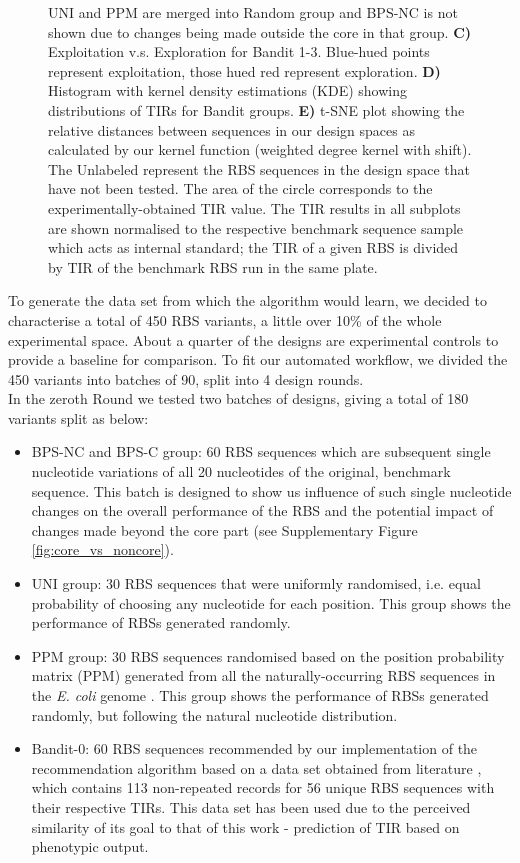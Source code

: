 \documentclass{scrartcl}[2013/05/29]%
\newcommand{\mengyan}[1]{\textcolor{magenta}{#1}}
\begin{document}
\begin{figure}[!ht]
{    UNI and PPM are merged into Random group and BPS-NC is not shown due to changes being made outside the core in that group.
    \textbf{C)} Exploitation v.s. Exploration for Bandit 1-3. Blue-hued points represent exploitation, those hued red represent exploration.
    \textbf{D)} Histogram with kernel density estimations (KDE) showing distributions of TIRs for Bandit groups.
    \textbf{E)} t-SNE plot showing the relative distances between sequences in our design spaces as calculated by our kernel function (weighted degree kernel with shift).
    The Unlabeled represent the RBS sequences in the design space that have not been tested.
    The area of the circle corresponds to the experimentally-obtained TIR value.
    The TIR results in all subplots are shown normalised to the respective benchmark sequence sample which acts as internal standard; the TIR of a given RBS is divided by TIR of the benchmark RBS run in the same plate. }
    \label{fig: Swarmplot and Quantplot}
\end{figure}

To generate the data set from which the algorithm would learn, we decided to characterise a total of 450 RBS variants, a little over 10\% of the whole experimental space. 
About a quarter of the designs are experimental controls to provide a baseline for comparison.
To fit our automated workflow, we divided the 450 variants into batches of 90, split into 4 design rounds.\\

In the zeroth Round we tested two batches of designs, giving a total of 180 variants split as below:

\begin{itemize}
    \item BPS-NC and BPS-C group: 60 RBS sequences which are subsequent single nucleotide variations of all 20 nucleotides of the original, benchmark sequence. This batch is designed to show us influence of such single nucleotide changes on the overall performance of the RBS and the potential impact of changes made beyond the core part (see Supplementary Figure \ref{fig:core_vs_noncore}).
    \item UNI group: 30 RBS sequences that were uniformly randomised, i.e. equal probability of choosing any nucleotide for each position. This group shows the performance of RBSs generated randomly.
    \item PPM group: 30 RBS sequences randomised based on the position probability matrix (PPM) generated from all the naturally-occurring RBS sequences in  the \emph{E. coli} genome \cite{barrick1994quantitative}. This group shows the performance of RBSs generated randomly, but following the natural nucleotide distribution.
    \item Bandit-0: 60 RBS sequences recommended by our implementation of the recommendation algorithm based on a data set obtained from literature \cite{jervis2018machine}, which contains 113 non-repeated records for 56 unique RBS sequences with their respective TIRs.
    This data set has been used due to the perceived similarity of its goal to that of this work - prediction of TIR based on phenotypic output.
\end{itemize}
\end{document}
